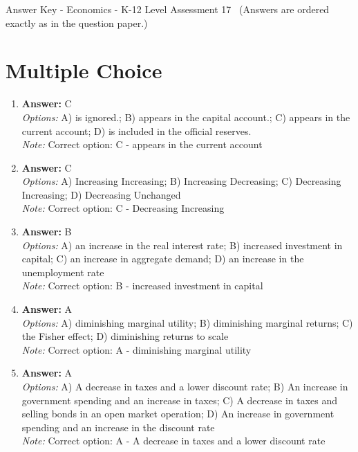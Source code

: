 \documentclass[12pt]{article}
\begin{document}
\begin{center}
Answer Key - Economics - K-12 Level Assessment 17 \
\small (Answers are ordered exactly as in the question paper.)
\end{center}

\section*{Multiple Choice}
\begin{enumerate}[label=\arabic*.]
\item \textbf{Answer:} C
\\ \textit{Options:} A) is ignored.; B) appears in the capital account.; C) appears in the current account; D) is included in the official reserves.
\\ \textit{Note:} Correct option: C - appears in the current account
\item \textbf{Answer:} C
\\ \textit{Options:} A) Increasing Increasing; B) Increasing Decreasing; C) Decreasing Increasing; D) Decreasing Unchanged
\\ \textit{Note:} Correct option: C - Decreasing Increasing
\item \textbf{Answer:} B
\\ \textit{Options:} A) an increase in the real interest rate; B) increased investment in capital; C) an increase in aggregate demand; D) an increase in the unemployment rate
\\ \textit{Note:} Correct option: B - increased investment in capital
\item \textbf{Answer:} A
\\ \textit{Options:} A) diminishing marginal utility; B) diminishing marginal returns; C) the Fisher effect; D) diminishing returns to scale
\\ \textit{Note:} Correct option: A - diminishing marginal utility
\item \textbf{Answer:} A
\\ \textit{Options:} A) A decrease in taxes and a lower discount rate; B) An increase in government spending and an increase in taxes; C) A decrease in taxes and selling bonds in an open market operation; D) An increase in government spending and an increase in the discount rate
\\ \textit{Note:} Correct option: A - A decrease in taxes and a lower discount rate
\end{enumerate}
\end{document}
